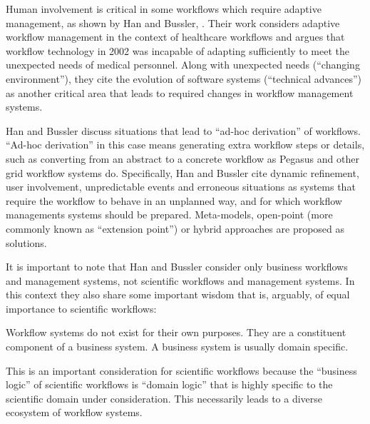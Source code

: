 Human involvement is critical in some workflows which require adaptive
management, as shown by Han and Bussler, \cite{han_taxonomy_1998}. Their work
considers adaptive workflow management in the context of healthcare
workflows and argues that workflow technology in 2002 was incapable of
adapting sufficiently to meet the unexpected needs of medical personnel.
Along with unexpected needs (``changing environment''), they cite the
evolution of software systems (``technical advances'') as another
critical area that leads to required changes in workflow management
systems.

Han and Bussler discuss situations that lead to ``ad-hoc derivation'' of
workflows. ``Ad-hoc derivation'' in this case means generating extra
workflow steps or details, such as converting from an abstract to a
concrete workflow as Pegasus and other grid workflow systems do.
Specifically, Han and Bussler cite dynamic refinement, user involvement,
unpredictable events and erroneous situations as systems that require
the workflow to behave in an unplanned way, and for which
workflow managements systems should be prepared. Meta-models, open-point
(more commonly known as ``extension point'') or hybrid approaches are
proposed as solutions.

It is important to note that Han and Bussler consider only business
workflows and management systems, not scientific workflows and
management systems. In this context they also share some important
wisdom that is, arguably, of equal importance to scientific workflows:

\begin{displayquote}
Workflow systems do not exist for their own purposes. They
are a constituent component of a business system. A business system is usually domain
specific.
\end{displayquote}

This is an important consideration for scientific workflows because the
``business logic'' of scientific workflows is ``domain logic'' that is
highly specific to the scientific domain under consideration. This
necessarily leads to a diverse ecosystem of workflow systems.


